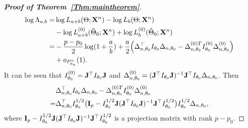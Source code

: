 \documentclass[11pt]{article}
\theoremstyle{plain}
\theoremstyle{definition}
\theoremstyle{remark}
\begin{document}
\begin{appendices}
    \begin{proof}[\textbf{Proof of Theorem~\ref{Thm:maintheorem}}]
$$
\begin{aligned}
\log \Lambda_{a,b}
    =&
    \log L_{a+b}(\Theta;\mathbf{X}^{n})-
    \log L_b(\Theta;\mathbf{X}^{n})
    \\
    &-
    \log L^{(0)}_{a+b}(\tilde{\Theta}_0;\mathbf{X}^{n})+
    \log L^{(0)}_b(\tilde{\Theta}_0;\mathbf{X}^{n})\\
    =&
    -\frac{p-p_0}{2}\log (1+\frac{a}{b})
    +
    \frac{a}{2}\Big(
    \Delta_{n,\theta_0}^\top  I_{\theta_0} \Delta_{n,\theta_0}
    -
    \Delta_{n,\theta_0}^{{(0)}T} I^{(0)}_{\theta_0} \Delta^{(0)}_{n,\theta_0}
    \Big)
    \\
    &+o_{P^n_{\theta_n}}(1).
\end{aligned}
$$
It can be seen that $I_{\theta_0}^{(0)}= \mathbf{J}^\top  I_{\theta_0}\mathbf{J}$ and $\Delta_{n,\theta_0}^{(0)}=(\mathbf{J}^\top  I_{\theta_0}\mathbf{J})^{-1} \mathbf{J}^\top  I_{\theta_0} \Delta_{n,\theta_0}$.
Then
\begin{equation*}
    \begin{split}
            &\Delta_{n,\theta_0}^\top  I_{\theta_0} \Delta_{n,\theta_0}
            -
            \Delta_{n,\theta_0}^{{(0)}T} I^{(0)}_{\theta_0} \Delta^{(0)}_{n,\theta_0}
            \\
            =&
            \Delta_{n,\theta_0}^\top  I_{\theta_0}^{1/2}\big(
            \mathbf{I}_p-
            I_{\theta_0}^{1/2} \mathbf{J} (\mathbf{J}^\top  I_{\theta_0} \mathbf{J})^{-1} \mathbf{J}^\top  I_{\theta_0}^{1/2}
            \big)I_{\theta_0}^{1/2}\Delta_{n,\theta_0},
    \end{split}
\end{equation*}
where $
            \mathbf{I}_p-
            I_{\theta_0}^{1/2} \mathbf{J} (\mathbf{J}^\top  I_{\theta_0} \mathbf{J})^{-1} \mathbf{J}^\top  I_{\theta_0}^{1/2}
$
is a projection matrix with rank $p-p_0$.


\end{proof}
\end{appendices}
\end{document}
